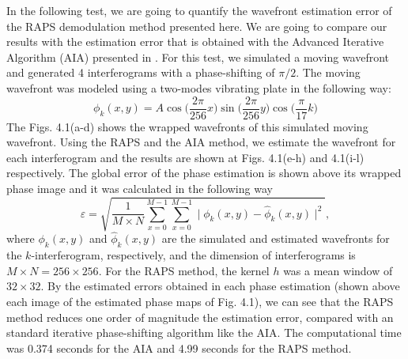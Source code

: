 In the following test, we are going to quantify the wavefront estimation error
of the RAPS demodulation method presented here. We are going to compare our
results with the estimation error that is obtained with the Advanced Iterative
Algorithm (AIA) presented in \cite{Wang:04}. For this test, we simulated a
moving wavefront and generated 4 interferograms with a phase-shifting of
$\pi/2$. The moving wavefront was modeled using a two-modes vibrating plate in
the following way:
\begin{equation}
 \phi_k (x,y) = A \cos \Big( \frac{2\pi}{256}x \Big) \sin \Big(
\frac{2\pi}{256}y \Big) \cos \Big( \frac{\pi}{17}k \Big)
\end{equation}
The Figs. 4.1(a-d) shows the wrapped wavefronts of this simulated moving
wavefront. Using the RAPS and the AIA method, we estimate the wavefront for each
interferogram and the results are shown at Figs. 4.1(e-h) and 4.1(i-l)
respectively. The global error of the phase estimation is shown above its
wrapped phase image and it was calculated in the following way
\begin{equation}
 \varepsilon = \sqrt{\frac{1}{M \times N} 
 \sum_{x=0}^{M-1} \sum_{x=0}^{M-1} 
 \mid \phi_{k}(x,y)-\hat{\phi}_{k}(x,y) \mid^2},
\end{equation}
where $\phi_{k}(x,y)$ and $\hat{\phi}_{k}(x,y)$ are the simulated and
estimated wavefronts for the $k$-interferogram, respectively, and the dimension
of interferograms is $M\times N = 256 \times 256$. For the RAPS method, the
kernel $h$ was a mean window of $32 \times 32$. By the estimated errors obtained
in each phase estimation (shown above each image of the estimated phase maps of
Fig. 4.1), we can see that the RAPS method reduces one order of magnitude the
estimation error, compared with an standard iterative phase-shifting algorithm
like the AIA. The computational time was 0.374 seconds for the AIA and 4.99
seconds for the RAPS method.

